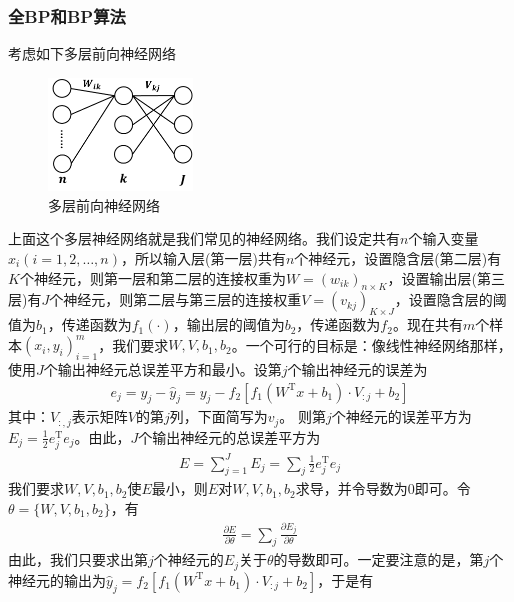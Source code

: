 {        \subsubsection{全BP和BP算法}
            \par
            考虑如下多层前向神经网络
            \begin{figure}[H]
            \centering
            \includegraphics[height=3cm]{images/multilayer_forward_neural_network.jpg}
            \caption{多层前向神经网络}
            \end{figure}
            上面这个多层神经网络就是我们常见的神经网络。我们设定共有$n$个输入变量$x_i(i=1,2,\dots,n)$，所以输入层(第一层)共有$n$个神经元，设置隐含层(第二层)有$K$个神经元，则第一层和第二层的连接权重为$W = (w_{ik})_{n\times K}$，设置输出层(第三层)有$J$个神经元，则第二层与第三层的连接权重$V = (v_{kj})_{K\times J}$，设置隐含层的阈值为$b_1$，传递函数为$f_1(\cdot)$，输出层的阈值为$b_2$，传递函数为$f_2$。现在共有$m$个样本$(x_i,y_i)_{i=1}^m$，我们要求$W,V,b_1,b_2$。一个可行的目标是：像线性神经网络那样，使用$J$个输出神经元总误差平方和最小。设第$j$个输出神经元的误差为
            \begin{align*}
            e_j = y_j - \hat{y}_j = y_j - f_2 \left[ f_1(W^\mathrm{T}x+b_1)\cdot V_{:j} + b_2  \right]
            \end{align*}
            其中：$V_{:,j}$表示矩阵$V$的第$j$列，下面简写为$v_j$。
            则第$j$个神经元的误差平方为$E_j = \frac{1}{2}e_j^\mathrm{T}e_j$。由此，$J$个输出神经元的总误差平方为
            \begin{align*}
            E= \sum_{j=1}^J E_j = \sum_j \frac{1}{2}e_j^\mathrm{T}e_j
            \end{align*}
            我们要求$W,V,b_1,b_2$使$E$最小，则$E$对$W,V,b_1,b_2$求导，并令导数为0即可。令$\theta = \{W,V,b_1,b_2\}$，有
            \begin{align*}
            \frac{\partial E}{\partial \theta} = \sum_j \frac{\partial E_j}{\partial \theta}
            \end{align*}
            由此，我们只要求出第$j$个神经元的$E_j$关于$\theta$的导数即可。一定要注意的是，第$j$个神经元的输出为$\hat{y}_j =f_2 \left[ f_1(W^\mathrm{T}x+b_1)\cdot V_{:j} + b_2  \right]$，于是有
}
